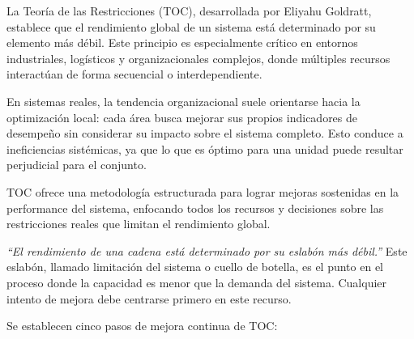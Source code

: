\documentclass[a4paper,oneside,11pt]{article}
\begin{document}
La Teoría de las Restricciones (TOC), desarrollada por Eliyahu Goldratt, establece que el rendimiento global de un sistema está determinado por su elemento más débil. Este principio es especialmente crítico en entornos industriales, logísticos y organizacionales complejos, donde múltiples recursos interactúan de forma secuencial o interdependiente.

En sistemas reales, la tendencia organizacional suele orientarse hacia la optimización local: cada área busca mejorar sus propios indicadores de desempeño sin considerar su impacto sobre el sistema completo. Esto conduce a ineficiencias sistémicas, ya que lo que es óptimo para una unidad puede resultar perjudicial para el conjunto.

TOC ofrece una metodología estructurada para lograr mejoras sostenidas en la performance del sistema, enfocando todos los recursos y decisiones sobre las restricciones reales que limitan el rendimiento global.

\textit{“El rendimiento de una cadena está determinado por su eslabón más débil.”}
Este eslabón, llamado limitación del sistema o cuello de botella, es el punto en el proceso donde la capacidad es menor que la demanda del sistema. Cualquier intento de mejora debe centrarse primero en este recurso.

Se establecen cinco pasos de mejora continua de TOC:
\end{document}
